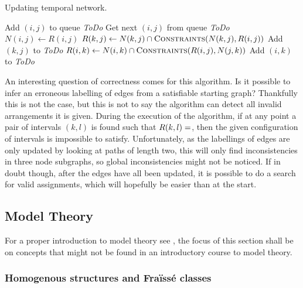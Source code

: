 \documentclass[../main.tex]{subfiles}
\begin{document}
\begin{algorithm}
  \caption{Updating temporal network. \cite{allen83}}\label{alg:main_algo}
  \begin{algorithmic}
      \State Add $(i,j)$ to queue \textit{ToDo}
        \State Get next $(i,j)$ from queue \textit{ToDo}
        \State $N(i,j) \gets R(i,j)$
          \State $R(k, j) \gets N(k,j) \cap \Call{Constraints}{N(k,j), R(i,j)}$
            \State Add $(k,j)$ to \textit{ToDo}
          \EndIf
        \EndFor
          \State $R(i, k) \gets N(i,k) \cap \Call{Constraints}{R(i,j), N(j,k)}$
            \State Add $(i,k)$ to \textit{ToDo}
          \EndIf
        \EndFor
      \EndWhile
    \EndProcedure
  \end{algorithmic}
\end{algorithm}

An interesting question of correctness comes for this algorithm. Is it possible to infer an
erroneous labelling of edges from a satisfiable starting graph? Thankfully this is not the case,
but this is not to say the algorithm can detect all invalid arrangements it is given. During the
execution of the algorithm, if at any point a pair of intervals $(k,l)$ is found such
that $R(k,l) = \empty$, then the given configuration of intervals is impossible to satisfy.
Unfortunately, as the labellings of edges are only updated by looking at paths of length two,
this will only find inconsistencies in three node subgraphs, so global inconsistencies might
not be noticed. If in doubt though, after the edges have all been updated, it is possible to
do a search for valid assignments, which will hopefully be easier than at the start.

\newpage

\subsection{Model Theory}%
\label{sub:model_theory}

For a proper introduction to model theory see \cite{marker02}, the focus of this section shall be
on concepts that might not be found in an introductory course to model theory.

\subsubsection{Homogenous structures and Fraïssé classes}%
\label{ssub:homogeneous_structures_and_fraisse_classes}
\end{document}
